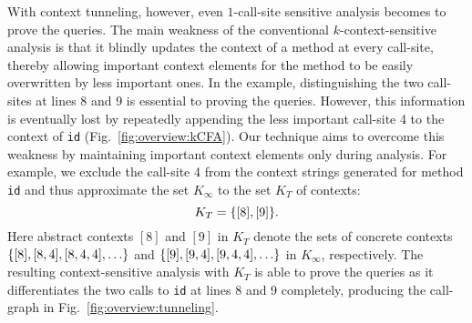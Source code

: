 

	

With context tunneling, however, even $1$-call-site sensitive analysis
becomes to prove the queries.
The main weakness of the conventional
$k$-context-sensitive analysis is that it blindly updates the context
of a method at every call-site, thereby allowing important context
elements for the method to be easily overwritten by less important
ones.  In the example, distinguishing the two call-sites
at lines 8 and 9 is essential to proving the queries. However, this
information is eventually lost by repeatedly appending the less
important call-site 4 to the context of {\tt id}
(Fig.~\ref{fig:overview:kCFA}).
Our technique aims to overcome this weakness by maintaining important
context elements only during analysis. For example, we exclude the
call-site 4 from the context strings generated for method {\tt id} and
thus approximate the set $K_{\infty}$ to the set $K_T$ of contexts:
\[
K_T = \{ [8], [9] \}.
\]
Here abstract contexts $[8]$ and $[9]$ in $K_{T}$ denote the sets of concrete contexts
$\myset{[8], [8,4], [8,4,4], \dots}$ and
$\myset{[9], [9,4], [9,4,4], \dots}$ in $K_{\infty}$, respectively. The resulting
context-sensitive analysis with $K_{T}$ is able to prove the queries as it differentiates the two calls
to {\tt id} at lines 8 and 9 completely, producing the call-graph in
Fig.~\ref{fig:overview:tunneling}.




